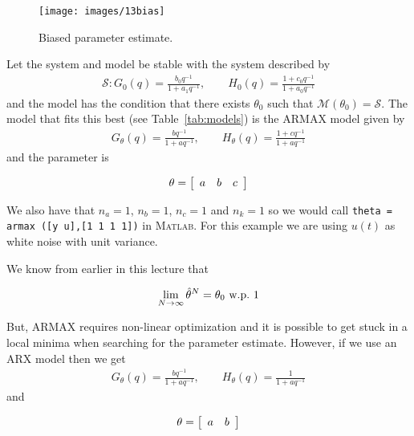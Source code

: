 \begin{figure}[ht!]
\centering
\texttt{[image: images/13bias]}
\caption{Biased parameter estimate.}%
\label{fig:13bias}
\end{figure}

\begin{example}%
\label{ex:convergence}
Let the system and model be stable with the system described by
\begin{align*}
\mathcal{S}: G_0(q) = \frac{b_0q^{-1}}{1+a_1q^{-1}}, \qquad H_0(q)=\frac{1+c_0q^{-1}}{1+a_0q^{-1}}
\end{align*}
and the model has the condition that there exists $\theta_0$ such that $\mathcal{M}(\theta_0) = \mathcal{S}$.
The model that fits this best (see Table~\ref{tab:models}) is the ARMAX model given by
\begin{align*}
G_\theta(q) = \frac{bq^{-1}}{1+aq^{-1}}, \qquad H_\theta(q)=\frac{1+cq^{-1}}{1+aq^{-1}}
\end{align*}
and the parameter is

\begin{equation*}
\theta=\left[\begin{array}{c c c} a & b & c \end{array}\right]
\end{equation*}

We also have that $n_a=1$, $n_b=1$, $n_c=1$ and $n_k=1$ so we would call \texttt{theta = armax ([y u],[1 1 1 1])} in \textsc{Matlab}.
For this example we are using $u (t)$ as white noise with unit variance.

We know from earlier in this lecture that

\begin{equation*}
\lim_{N\to\infty}\hat{\theta}^N= \theta_0 \text{~w.p.~} 1
\end{equation*}

But, ARMAX requires non-linear optimization and it is possible to get stuck in a local minima when searching for the parameter estimate.
However, if we use an ARX model then we get
\begin{align*}
G_\theta(q) = \frac{bq^{-1}}{1+aq^{-1}}, \qquad H_\theta(q)=\frac{1}{1+aq^{-1}}
\end{align*}
and

\begin{equation*}
\theta=\left[\begin{array}{c c} a & b \end{array}\right]
\end{equation*}


\end{example}
